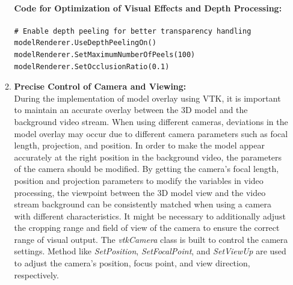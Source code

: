 \documentclass[12pt]{article}
\begin{document}
\begin{enumerate}
\begin{enumerate}
                        \paragraph{Code for Optimization of Visual Effects and Depth Processing:}
                        \begin{verbatim}
# Enable depth peeling for better transparency handling
modelRenderer.UseDepthPeelingOn()
modelRenderer.SetMaximumNumberOfPeels(100)
modelRenderer.SetOcclusionRatio(0.1)
                        \end{verbatim}
                  \item \textbf{Precise Control of Camera and Viewing:}
                        \label{sec:precise}
                        \\
                        During the implementation of model overlay using VTK, it is important to maintain an accurate overlay between the 3D model and the background video stream. When using different cameras, deviations in the model overlay may occur due to different camera parameters such as focal length, projection, and position. In order to make the model appear accurately at the right position in the background video, the parameters of the camera should be modified. By getting the camera's focal length, position and projection parameters to modify the variables in video processing, the viewpoint between the 3D model view and the video stream background can be consistently matched when using a camera with different characteristics. It might be necessary to additionally adjust the cropping range and field of view of the camera to ensure the correct range of visual output. The \emph{vtkCamera} class is built to control the camera settings. Method like \emph{SetPosition}, \emph{SetFocalPoint}, and \emph{SetViewUp} are used to adjust the camera's position, focus point, and view direction, respectively.\cite{vtk_examples_camera,vtk_camera_doc_2023}

\end{enumerate}
\end{enumerate}
\end{document}
